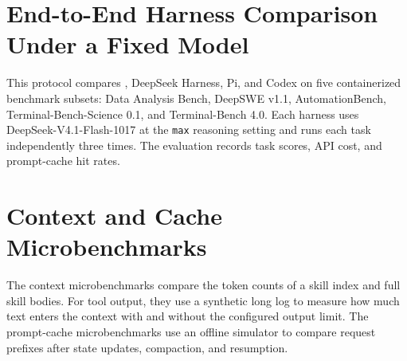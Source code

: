 \appendix

\section{End-to-End Harness Comparison Under a Fixed Model}
\label{sec:appendix-harness-comparison}

This protocol compares \fwname, DeepSeek Harness, Pi, and Codex on five containerized benchmark subsets: Data Analysis Bench, DeepSWE v1.1, AutomationBench, Terminal-Bench-Science 0.1, and Terminal-Bench 4.0. Each harness uses DeepSeek-V4.1-Flash-1017 at the \texttt{max} reasoning setting and runs each task independently three times. The evaluation records task scores, API cost, and prompt-cache hit rates.

\section{Context and Cache Microbenchmarks}
\label{sec:appendix-microbenchmarks}

The context microbenchmarks compare the token counts of a skill index and full skill bodies. For tool output, they use a synthetic long log to measure how much text enters the context with and without the configured output limit. The prompt-cache microbenchmarks use an offline simulator to compare request prefixes after state updates, compaction, and resumption.
